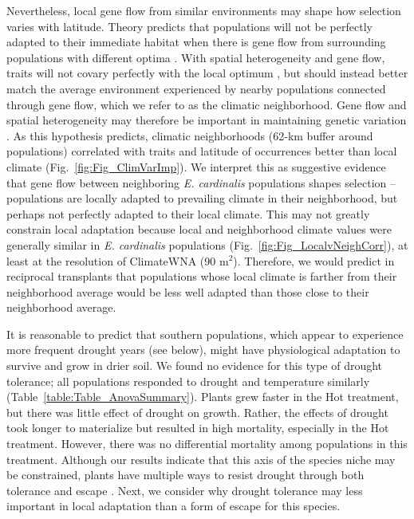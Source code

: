 \documentclass[11pt, oneside]{article}
\begin{document}
Nevertheless, local gene flow from similar environments may shape how selection varies with latitude. Theory predicts that populations will not be perfectly adapted to their immediate habitat when there is gene flow from surrounding populations with different optima \citep{Lenormand_2002}. With spatial heterogeneity and gene flow, traits will not covary perfectly with the local optimum \citep{Slatkin_1978, Paul_etal_2011, Hadfield_2016}, but should instead better match the average environment experienced by nearby populations connected through gene flow, which we refer to as the climatic neighborhood. Gene flow and spatial heterogeneity may therefore be important in maintaining genetic variation \citep{Yeaman_Jarvis_2006}. As this hypothesis predicts, climatic neighborhoods (62-km buffer around populations) correlated with traits and latitude of occurrences better than local climate (Fig.~\ref{fig:Fig_ClimVarImp}). We interpret this as suggestive evidence that gene flow between neighboring \textit{E. cardinalis} populations shapes selection -- populations are locally adapted to prevailing climate in their neighborhood, but perhaps not perfectly adapted to their local climate. This may not greatly constrain local adaptation because local and neighborhood climate values were generally similar in \textit{E. cardinalis} populations (Fig.~\ref{fig:Fig_LocalvNeighCorr}), at least at the resolution of ClimateWNA (90 m$^2$). Therefore, we would predict in reciprocal transplants that populations whose local climate is farther from their neighborhood average would be less well adapted than those close to their neighborhood average.

It is reasonable to predict that southern populations, which appear to experience more frequent drought years (see below), might have physiological adaptation to survive and grow in drier soil. We found no evidence for this type of drought tolerance; all populations responded to drought and temperature similarly (Table~\ref{table:Table_AnovaSummary}). Plants grew faster in the Hot treatment, but there was little effect of drought on growth. Rather, the effects of drought took longer to materialize but resulted in high mortality, especially in the Hot treatment. However, there was no differential mortality among populations in this treatment. Although our results indicate that this axis of the species niche may be constrained, plants have multiple ways to resist drought through both tolerance and escape \citep{Ludlow_1989, Kooyers_2015}. Next, we consider why drought tolerance may less important in local adaptation than a form of escape for this species.
\end{document}
